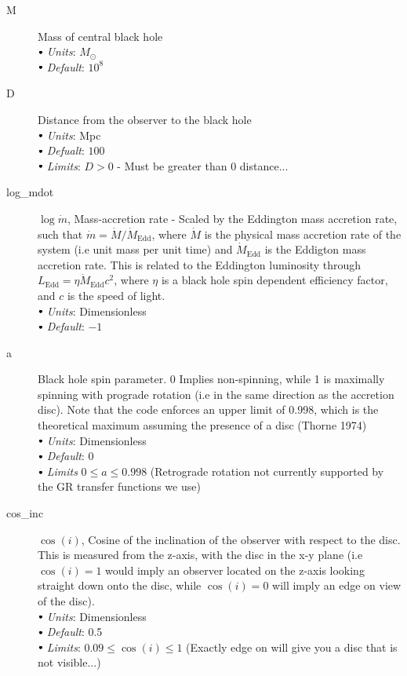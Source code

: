 \documentclass[a4paper, 11pt, times, onecolumn]{article}
\newcommand{\Msol}{M_{\odot}}
\newcommand{\mdot}{\dot{m}}
\newcommand{\Mdot}{\dot{M}}
\newcommand{\Mdedd}{\dot{M}_{\mathrm{Edd}}}
\newcommand{\Ledd}{L_{\mathrm{Edd}}}
\newcommand{\sbt}{\,\begin{picture}(-1,1)(-1,-3)\circle*{3}\end{picture}\ }
\begin{document}
\begin{description}
	\item[M] Mass of central black hole \\
		$\sbt$ {\it Units}: $\Msol$ \\
		$\sbt$ {\it Default}: $10^{8}$ \\

	
	\item[D]  Distance from the observer to the black hole \\
		$\sbt$ {\it Units}: Mpc \\
		$\sbt$ {\it Defualt}: $100$ \\
		$\sbt$ {\it Limits}: $D>0$ - Must be greater than 0 distance...
	
	\item[log\_mdot] $\log \mdot$, Mass-accretion rate - Scaled by the Eddington mass accretion rate, such that $\mdot = \Mdot/\Mdedd$, where $\Mdot$ is the physical mass accretion rate of the system (i.e unit mass per unit time) and $\Mdedd$ is the Eddigton mass accretion rate. This is related to the Eddington luminosity through $\Ledd = \eta \Mdedd c^{2}$, where $\eta$ is a black hole spin dependent efficiency factor, and $c$ is the speed of light. \\
		$\sbt$ {\it Units}: Dimensionless \\
		$\sbt$ {\it Default}: $-1$ \\
	
	\item[a] Black hole spin parameter. 0 Implies non-spinning, while 1 is maximally spinning with prograde rotation (i.e in the same direction as the accretion disc). Note that the code enforces an upper limit of 0.998, which is the theoretical maximum assuming the presence of a disc (Thorne 1974) \\
		$\sbt$ {\it Units}: Dimensionless \\
		$\sbt$ {\it Default}: $0$ \\
		$\sbt$ {\it Limits} $0 \leq a \leq 0.998$ (Retrograde rotation not currently supported by the GR transfer functions we use)
	
	\item[cos\_inc]  $\cos(i)$, Cosine of the inclination of the observer with respect to the disc. This is measured from the z-axis, with the disc in the x-y plane (i.e $\cos(i) = 1$ would imply an observer located on the z-axis looking straight down onto the disc, while $\cos(i) = 0$ will imply an edge on view of the disc). \\
		$\sbt$ {\it Units}: Dimensionless \\
		$\sbt$ {\it Default}: 0.5 \\
		$\sbt$ {\it Limits}: $0.09 \leq \cos(i) \leq 1$ (Exactly edge on will give you a disc that is not visible...) 
		

\end{description}
\end{document}
